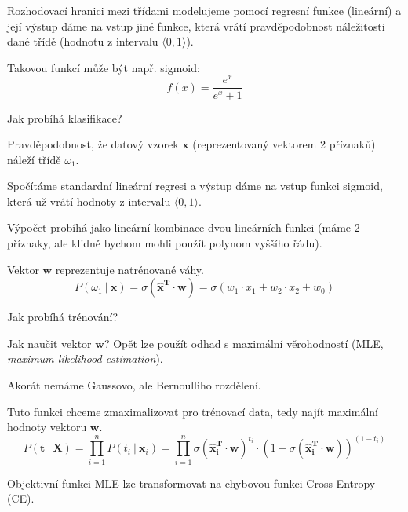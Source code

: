 \begin{compactitem}
    \item Rozhodovací hranici mezi třídami modelujeme pomocí regresní funkce (lineární) a její výstup dáme na vstup jiné funkce, která vrátí pravděpodobnost náležitosti dané třídě (hodnotu z intervalu $\langle 0, 1 \rangle$). \begin{compactitem}
        \item Takovou funkcí může být např. sigmoid:
        $$ f(x) = \frac{e^x}{e^x + 1} $$
    \end{compactitem}

    \item Jak probíhá klasifikace? \begin{compactitem}
        \item Pravděpodobnost, že datový vzorek $\textbf{x}$ (reprezentovaný vektorem 2 příznaků) náleží třídě $\omega_1$.
        \item Spočítáme standardní lineární regresi a výstup dáme na vstup funkci sigmoid, která už vrátí hodnoty z intervalu $\langle 0, 1 \rangle$.
        \item Výpočet probíhá jako lineární kombinace dvou lineárních funkci (máme 2 příznaky, ale klidně bychom mohli použít polynom vyššího řádu).
        \item Vektor $\mathbf{w}$ reprezentuje natrénované váhy.
        $$ P(\omega_1 ~|~ \textbf{x}) = \sigma(\mathbf{\hat{x}^T} \cdot \mathbf{w}) = \sigma(w_1 \cdot x_1 + w_2 \cdot x_2 + w_0)$$
    \end{compactitem}

    \item Jak probíhá trénování? \begin{compactitem}
        \item Jak naučit vektor $\mathbf{w}$? Opět lze použít odhad s maximální věrohodností (MLE, \textit{maximum likelihood estimation}).

        \item Akorát nemáme Gaussovo, ale Bernoulliho rozdělení.

        \item Tuto funkci chceme zmaximalizovat pro trénovací data, tedy najít maximální hodnoty vektoru $\mathbf{w}$.
        $$ P(\mathbf{t} ~|~ \mathbf{X}) = \prod_{i=1}^n P(t_i ~|~ \mathbf{x}_i) = \prod_{i=1}^n \sigma(\mathbf{\hat{x}_i^T} \cdot \mathbf{w})^{t_i} \cdot (1 - \sigma(\mathbf{\hat{x}_i^T} \cdot \mathbf{w}))^{(1 - t_i)}$$

        \item Objektivní funkci MLE lze transformovat na chybovou funkci Cross Entropy (CE).
    \end{compactitem}
\end{compactitem}

